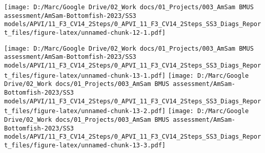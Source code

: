 \documentclass[
]{article}
\begin{document}
\texttt{[image: D:/Marc/Google Drive/02\_Work docs/01\_Projects/003\_AmSam BMUS assessment/AmSam-Bottomfish-2023/SS3 models/APVI/11\_F3\_CV14\_2Steps/0\_APVI\_11\_F3\_CV14\_2Steps\_SS3\_Diags\_Report\_files/figure-latex/unnamed-chunk-12-1.pdf]}

\texttt{[image: D:/Marc/Google Drive/02\_Work docs/01\_Projects/003\_AmSam BMUS assessment/AmSam-Bottomfish-2023/SS3 models/APVI/11\_F3\_CV14\_2Steps/0\_APVI\_11\_F3\_CV14\_2Steps\_SS3\_Diags\_Report\_files/figure-latex/unnamed-chunk-13-1.pdf]}
\texttt{[image: D:/Marc/Google Drive/02\_Work docs/01\_Projects/003\_AmSam BMUS assessment/AmSam-Bottomfish-2023/SS3 models/APVI/11\_F3\_CV14\_2Steps/0\_APVI\_11\_F3\_CV14\_2Steps\_SS3\_Diags\_Report\_files/figure-latex/unnamed-chunk-13-2.pdf]}
\texttt{[image: D:/Marc/Google Drive/02\_Work docs/01\_Projects/003\_AmSam BMUS assessment/AmSam-Bottomfish-2023/SS3 models/APVI/11\_F3\_CV14\_2Steps/0\_APVI\_11\_F3\_CV14\_2Steps\_SS3\_Diags\_Report\_files/figure-latex/unnamed-chunk-13-3.pdf]}

\hypertarget{section}{%
\subsection{}\label{section}}
\end{document}
